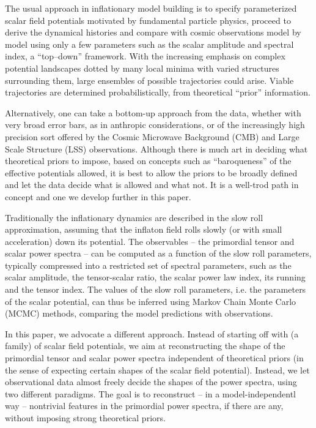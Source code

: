\documentclass[11pt]{article}
\begin{document}
The usual approach in inflationary model building is to specify parameterized scalar field potentials motivated by fundamental particle physics, proceed to derive the dynamical histories and compare with cosmic observations model by model using only a few parameters such as the scalar amplitude and spectral index, a ``top--down'' framework. With the increasing emphasis on complex potential landscapes dotted by many local minima with varied structures surrounding them, large ensembles of possible trajectories could arise. Viable trajectories are determined probabilistically, from theoretical ``prior'' information.

Alternatively, one can take a bottom-up approach from the data, whether with very broad error bars, as in anthropic considerations, or of the increasingly high precision sort offered by the Cosmic Microwave Background (CMB) and Large Scale Structure (LSS) observations. Although there is much art in deciding what theoretical priors to impose, based on concepts such as ``baroqueness'' of the effective potentials allowed, it is best to allow the priors to be broadly defined and let the data decide what is allowed and what not. It is a well-trod path in concept and one we develop further in this paper.

Traditionally the inflationary dynamics are described in the slow roll approximation, assuming that the inflaton field rolls slowly (or with small acceleration) down its potential. The observables -- the primordial tensor and scalar power spectra -- can be computed as a function of the slow roll parameters, typically compressed into a restricted set of spectral parameters, such as the scalar amplitude, the tensor-scalar ratio, the scalar power law index, its running and the tensor index. The values of the slow roll parameters, i.e. the parameters of the scalar potential, can thus be inferred using Markov Chain Monte Carlo (MCMC) methods, comparing the model predictions with observations. 

In this paper, we advocate a different approach. Instead of starting off with (a family) of scalar field potentials, we aim at reconstructing the shape of the primordial tensor and scalar power spectra independent of theoretical priors (in the sense of expecting certain shapes of the scalar field potential). Instead, we let observational data almost freely decide the shapes of the power spectra, using two different paradigms. The goal is to reconstruct -- in a model-independentl way -- nontrivial features in the primordial power spectra, if there are any, without imposing strong theoretical priors.
\end{document}
